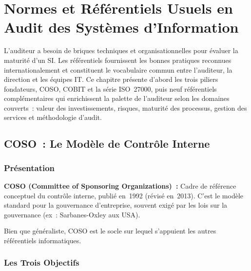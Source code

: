 
\chapter{Normes et Référentiels Usuels en Audit des Systèmes d'Information}\label{chap:04_referentiels}

L'auditeur a besoin de \og{}briques\fg{} techniques et organisationnelles pour évaluer la maturité
d'un SI. Les référentiels fournissent les bonnes pratiques reconnues internationalement et
constituent le vocabulaire commun entre l'auditeur, la direction et les équipes IT.
Ce chapitre présente d'abord les trois piliers fondateurs, COSO, COBIT et la série ISO~27000,
puis neuf référentiels complémentaires qui enrichissent la palette de l'auditeur selon les
domaines couverts~: valeur des investissements, risques, maturité des processus, gestion des
services et méthodologie d'audit.

\section{COSO~: Le Modèle de Contrôle Interne}
\label{sec:coso}

\subsection{Présentation}

\begin{boxdef}
\textbf{COSO (Committee of Sponsoring Organizations)~:} Cadre de référence conceptuel du
contrôle interne, publié en~1992 (révisé en~2013). C'est le modèle standard pour la gouvernance
d'entreprise, souvent exigé par les lois sur la gouvernance (ex~: Sarbanes-Oxley aux USA).
\end{boxdef}

Bien que généraliste, COSO est le socle sur lequel s'appuient les autres référentiels
informatiques.

\subsection{Les Trois Objectifs}

